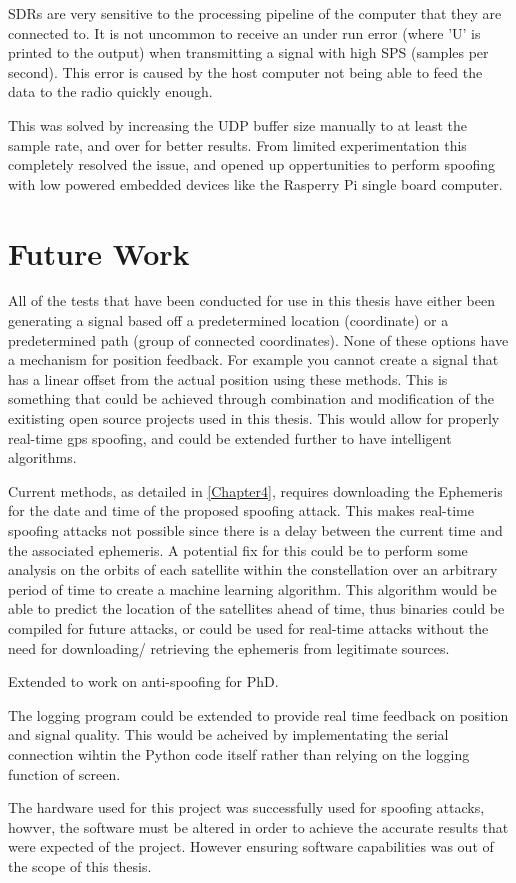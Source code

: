 SDRs are very sensitive to the processing pipeline of the computer that they are connected to. It is not uncommon to receive an under run error (where 'U' is printed to the
output) when transmitting a signal with high SPS (samples per second). This error is caused by the host computer not being able to feed the data to the radio quickly
enough.

This was solved by increasing the UDP buffer size manually to at least the sample rate, and over for better results. From limited experimentation this completely resolved the issue, and opened up
oppertunities to perform spoofing with low powered embedded devices like the Rasperry Pi single board computer.

\section{Future Work}
All of the tests that have been conducted for use in this thesis have either been generating a signal based off a predetermined location (coordinate) or a predetermined
path (group of connected coordinates). None of these options have a mechanism for position feedback. For example you cannot create a signal that has a linear offset from
the actual position using these methods. This is something that could be achieved through combination and modification of the exitisting open source projects used in this
thesis. This would allow for properly real-time gps spoofing, and could be extended further to have intelligent algorithms.

Current methods, as detailed in \ref{Chapter4}, requires downloading the Ephemeris for the date and time of the proposed spoofing attack. This makes real-time spoofing
attacks not possible since there is a delay between the current time and the associated ephemeris. A potential fix for this could be to perform some analysis on the
orbits of each satellite within the constellation over an arbitrary period of time to create a machine learning algorithm. This algorithm would be able to predict the
location of the satellites ahead of time, thus binaries could be compiled for future attacks, or could be used for real-time attacks without the need for downloading/
retrieving the ephemeris from legitimate sources.

Extended to work on anti-spoofing for PhD.

The logging program could be extended to provide real time feedback on position and signal quality. This would be acheived by implementating the serial connection wihtin
the Python code itself rather than relying on the logging function of screen.

The hardware used for this project was successfully used for spoofing attacks, howver, the software must be altered in order to achieve the accurate results that were
expected of the project. However ensuring software capabilities was out of the scope of this thesis.
